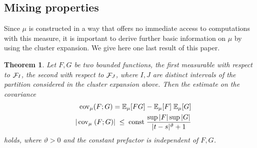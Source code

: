 \documentclass[a4paper,11pt]{article}
\newtheorem{theorem}{Theorem}[section]
\newcommand{\F}{\mathop{\mathrm{{\cal F}}}\nolimits}
\newcommand{\cov}{\mathop{\mathrm{cov}}\nolimits}
\newcounter {constant}
\begin{document}
\subsection{Mixing properties}
Since $\mu$ is constructed in a way that offers no immediate 
access to computations with this measure, it is important to 
derive further basic information on $\mu$ by using the cluster
expansion. We give here one last result of this paper. 
\begin{theorem}
Let $F,G$ be two bounded functions, the first measurable with respect 
to $\F_I$, the second with respect to $\F_J$, where $I,J$ are distinct 
intervals of the partition considered in the cluster expansion above. 
Then the estimate on the covariance 
\begin{eqnarray*}
&& \cov_\mu (F;G) = \mathbb{E}_\mu[F G] - \mathbb{E}_\mu[F] \; 
\mathbb{E}_\mu[G] \\
&& |\cov_\mu \; (F;G)| \;\leq \; \mbox{\rm{const}} \; 
\frac{\sup{|F|} \sup{|G|}} {|t-s|^\vartheta + 1}
\end{eqnarray*}
holds, where $\vartheta > 0$ and the constant prefactor is 
independent of $F,G$.
\end{theorem}
\end{document}
